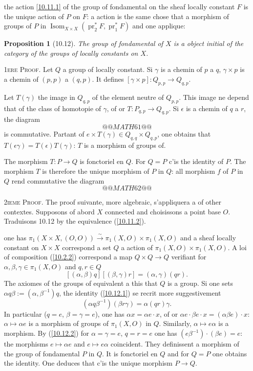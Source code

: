 \documentclass[12pt,a4paper]{article}
\theoremstyle{plain}
\newtheorem{proposition}[theorem]{Proposition}
\theoremstyle{definition}
\theoremstyle{remark}
\DeclareMathOperator{\Isom}{Isom}
\DeclareMathOperator{\pr}{pr}
\begin{document}
the action \ref{10.11.1} of the group of fondamental on the sheaf locally constant $F$ is the unique action of $P$ on $F$: a action is the same chose that a morphism of groups of $P$ in $\Isom_{X \times X}(\pr_2^* F, \pr_1^* F)$ and one applique:

\begin{proposition}[10.12]
The group of fondamental of $X$ is a object initial of the category of the groups of locally constants on $X$.
\end{proposition}

\textsc{1ere Proof.} Let $Q$ a group of locally constant. Si $\gamma$ is a chemin of $p$ a $q$, $\gamma \times p$ is a chemin of $(p,p)$ a $(q,p)$. It defines $[\gamma \times p]: Q_{p,p} \to Q_{q,p}$.

Let $T(\gamma)$ the image in $Q_{q,p}$ of the element neutre of $Q_{p,p}$. This image ne depend that of the class of homotopie of $\gamma$, of or $T: P_{q,p} \to Q_{q,p}$. Si $\epsilon$ is a chemin of $q$ a $r$, the diagram
$$@@MATH61@@$$
is commutative. Partant of $e \times T(\gamma) \in Q_{q,q} \times Q_{q,p}$, one obtains that $T(\epsilon \gamma) = T(\epsilon) T(\gamma)$: $T$ is a morphism of groups of.

The morphism $T: P \to Q$ is fonctoriel en $Q$. For $Q = P$ c'is the identity of $P$. The morphism $T$ is therefore the unique morphism of $P$ in $Q$: all morphism $f$ of $P$ in $Q$ rend commutative the diagram
$$@@MATH62@@$$

\textsc{2ieme Proof.} The proof suivante, more algebraic, s'appliquera a of other contextes. Supposons of abord $X$ connected and choisissons a point base $O$. Traduisons 10.12 by the equivalence (\ref{10.11.2}).

one has $\pi_1(X \times X, (O,O)) \xrightarrow{\sim} \pi_1(X,O) \times \pi_1(X,O)$ and a sheaf locally constant on $X \times X$ correspond a set $Q$ a action of $\pi_1(X,O) \times \pi_1(X,O)$. A loi of composition (\ref{10.2.2}) correspond a map $Q \times Q \to Q$ verifiant for $\alpha, \beta, \gamma \in \pi_1(X,O)$ and $q, r \in Q$
\begin{equation}\label{10.12.1}
[(\alpha, \beta)q][(\beta, \gamma)r] = (\alpha, \gamma)(qr). \tag{10.12.1}
\end{equation}
The axiomes of the groups of equivalent a this that $Q$ is a group. Si one sets $\alpha q \beta := (\alpha, \beta^{-1})q$, the identity (\ref{10.12.1}) se recrit more suggestivement
\begin{equation}\label{10.12.2}
(\alpha q \beta^{-1})(\beta r \gamma) = \alpha (qr) \gamma. \tag{10.12.2}
\end{equation}
In particular ($q=e$, $\beta=\gamma=e$), one has $\alpha x = \alpha e \cdot x$, of or $\alpha e \cdot \beta e \cdot x = (\alpha \beta e)\cdot x$: $\alpha \mapsto \alpha e$ is a morphism of groups of $\pi_1(X,O)$ in $Q$. Similarly, $\alpha \mapsto e\alpha$ is a morphism. By (\ref{10.12.2}) for $\alpha=\gamma=e$, $q=r=e$ one has $(e\beta^{-1})\cdot(\beta e) = e$: the morphisms $e \mapsto \alpha e$ and $e \mapsto e\alpha$ coincident. They definissent a morphism of the group of fondamental $P$ in $Q$. It is fonctoriel en $Q$ and for $Q = P$ one obtains the identity. One deduces that c'is the unique morphism $P \to Q$.
\end{document}
